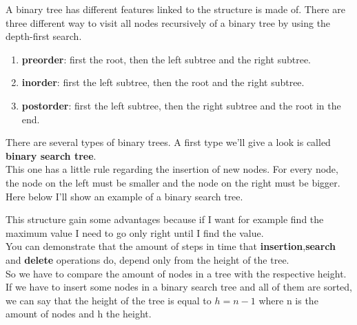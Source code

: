 \documentclass{article}
\begin{document}
A binary tree has different features linked to the structure is made of. There are three different way to visit all nodes recursively of a binary tree by using the depth-first search. \\
\begin{enumerate}
\item \textbf{preorder}: first the root, then the left subtree and the right subtree.
\item \textbf{inorder}: first the left subtree, then the root and the right subtree.
\item \textbf{postorder}: first the left subtree, then the right subtree and the root in the end.
\end{enumerate}
There are several types of binary trees. A first type we'll give a look is called \textbf{binary search tree}.\\
This one has a little rule regarding the insertion of new nodes. For every node, the node on the left must be smaller and the node on the right must be bigger. Here below I'll show an example of a binary search tree.


This structure gain some advantages because if I want for example find the maximum value I need to go only right until I find the value.\\
You can demonstrate that the amount of steps in time that \textbf{insertion},\textbf{search} and \textbf{delete} operations do, depend only from the height of the tree.\\
So we have to compare the amount of nodes in a tree with the respective height.\\
If we have to insert some nodes in a binary search tree and all of them are sorted, we can say that the height of the tree is equal to $h=n-1$ where n is the amount of nodes and h the height.

\end{document}
